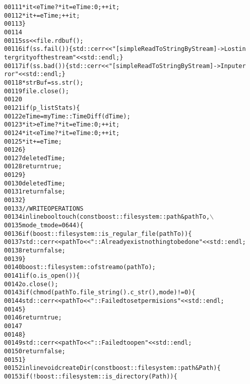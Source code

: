 \begin{footnotesize}
\begin{alltt}
00111                 *it < eTime ? *it = eTime : 0;      ++it;
00112                 *it += eTime;                       ++it;
00113             \}
00114 
00115             ss << file.rdbuf();
00116                 \textcolor{keywordflow}{if} (ss.fail())\{ std::cerr<<\textcolor{stringliteral}{"[simpleReadToStringByStream]->Lost in
      tergrity of the stream"}<<std::endl; \}
00117                 \textcolor{keywordflow}{if} (ss.bad())\{ std::cerr<<\textcolor{stringliteral}{"[simpleReadToStringByStream]->Input er
      ror"}<<std::endl; \}
00118             *strBuf = ss.str();
00119             file.close();
00120 
00121             \textcolor{keywordflow}{if} (p\_listStats)\{
00122                 eTime = myTime::TimeDiff( dTime );
00123                 *it > eTime ? *it = eTime : 0;      ++it;
00124                 *it < eTime ? *it = eTime : 0;      ++it;
00125                 *it += eTime;
00126             \}
00127             \textcolor{keyword}{delete} dTime;
00128             \textcolor{keywordflow}{return} \textcolor{keyword}{true};
00129         \}
00130         \textcolor{keyword}{delete} dTime;
00131         \textcolor{keywordflow}{return} \textcolor{keyword}{false};
00132     \}
00133     \textcolor{comment}{//WRITE OPERATIONS}
00134     \textcolor{keyword}{inline} \textcolor{keywordtype}{bool} touch(\textcolor{keyword}{const} boost::filesystem::path &pathTo,\(\backslash\)
00135                       mode\_t mode =0644)\{
00136         \textcolor{keywordflow}{if} ( boost::filesystem::is\_regular\_file(pathTo) )\{
00137             std::cerr<<pathTo<<\textcolor{stringliteral}{"::Already exist nothing to be done"}<<std::endl;
00138             \textcolor{keywordflow}{return} \textcolor{keyword}{false};
00139         \}
00140         boost::filesystem::ofstream o (pathTo);
00141         \textcolor{keywordflow}{if}(o.is\_open())\{
00142             o.close();
00143             \textcolor{keywordflow}{if} (chmod(pathTo.file\_string().c\_str(),mode)!= 0)\{
00144                     std::cerr<<pathTo<<\textcolor{stringliteral}{"::Failed to set permisions"}<<std::endl;
00145             \}
00146             \textcolor{keywordflow}{return} \textcolor{keyword}{true};
00147 
00148         \}
00149         std::cerr<<pathTo<<\textcolor{stringliteral}{"::Failed to open"}<<std::endl;
00150         \textcolor{keywordflow}{return} \textcolor{keyword}{false};
00151     \}
00152     \textcolor{keyword}{inline} \textcolor{keywordtype}{void} createDir(\textcolor{keyword}{const} boost::filesystem::path &Path)\{
00153         \textcolor{keywordflow}{if} (!  boost::filesystem::is\_directory(Path) )\{

\end{alltt}
\end{footnotesize}
